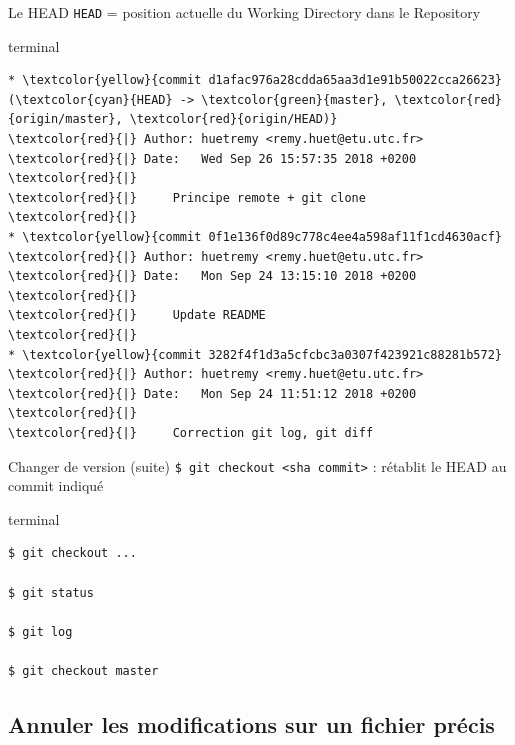 \documentclass[usepdftitle=false]{beamer}
\begin{document}
\begin{frame}[fragile]{Le HEAD}
		\verb+HEAD+ = position actuelle du Working Directory dans le Repository

	\begin{beamercolorbox}[rounded=true,shadow=true]{terminal}
\begin{Verbatim}
* \textcolor{yellow}{commit d1afac976a28cdda65aa3d1e91b50022cca26623} (\textcolor{cyan}{HEAD} -> \textcolor{green}{master}, \textcolor{red}{origin/master}, \textcolor{red}{origin/HEAD)}
\textcolor{red}{|} Author: huetremy <remy.huet@etu.utc.fr>
\textcolor{red}{|} Date:   Wed Sep 26 15:57:35 2018 +0200
\textcolor{red}{|}
\textcolor{red}{|}     Principe remote + git clone
\textcolor{red}{|}
* \textcolor{yellow}{commit 0f1e136f0d89c778c4ee4a598af11f1cd4630acf}
\textcolor{red}{|} Author: huetremy <remy.huet@etu.utc.fr>
\textcolor{red}{|} Date:   Mon Sep 24 13:15:10 2018 +0200
\textcolor{red}{|}
\textcolor{red}{|}     Update README
\textcolor{red}{|}
* \textcolor{yellow}{commit 3282f4f1d3a5cfcbc3a0307f423921c88281b572}
\textcolor{red}{|} Author: huetremy <remy.huet@etu.utc.fr>
\textcolor{red}{|} Date:   Mon Sep 24 11:51:12 2018 +0200
\textcolor{red}{|}
\textcolor{red}{|}     Correction git log, git diff
\end{Verbatim}
	\end{beamercolorbox}
\end{frame}

\begin{frame}[fragile]{Changer de version (suite)}
	\verb+$ git checkout <sha commit>+ : rétablit le HEAD au commit indiqué

	\begin{beamercolorbox}[rounded=true,shadow=true]{terminal}
\begin{Verbatim}
$ git checkout ...

$ git status

$ git log

$ git checkout master
\end{Verbatim}
	\end{beamercolorbox}
\end{frame}

\subsection{Annuler les modifications sur un fichier précis}
\end{document}
